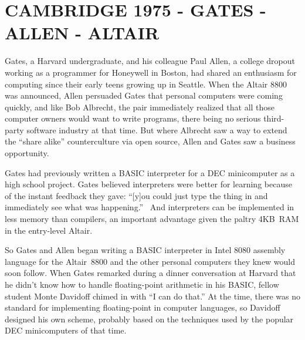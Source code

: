 
\section{CAMBRIDGE 1975 - GATES - ALLEN - ALTAIR}



Gates, a Harvard undergraduate, and his colleague 
Paul Allen, a college dropout working as a programmer for Honeywell
in Boston, had shared an enthusiasm for computing since their early
teens growing up in Seattle.
When the Altair 8800 was announced,
Allen persuaded Gates that personal computers were coming quickly, and
like Bob Albrecht, the pair immediately realized that all those
computer owners would want to write programs, there being no serious third-party
software industry at that time.
But where Albrecht saw a way to extend the ``share alike''
counterculture via open source, Allen and Gates saw a business opportunity.

Gates had
previously written a BASIC interpreter for  a DEC 
minicomputer 
as a  high school project.  Gates believed interpreters were better for
learning because of the instant feedback they gave:
``[y]ou could just type
the thing in and immediately see what was
happening.''~\cite{smithsonian_interview} 
And interpreters can be implemented in less memory than compilers,
an important advantage given the paltry 4KB~RAM in the entry-level  Altair.

So Gates and Allen began writing a BASIC interpreter in Intel 8080
assembly language for the
Altair~8800 and the other personal computers they
knew would soon follow.
When Gates remarked during a dinner conversation at Harvard
that he didn't know how to handle floating-point arithmetic in his
BASIC, fellow student Monte Davidoff chimed in with ``I can do that.''
At the time, there was no standard for implementing floating-point in
computer languages, so Davidoff designed his own scheme, probably based
on the techniques used by the popular DEC minicomputers of that time.

